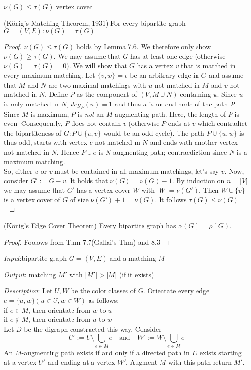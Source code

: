 $\nu(G) \leq \tau(G)$ vertex cover 
\begin{thm}(König's Matching Theorem, 1931)
For every bipartite graph $G=(V,E): \nu(G)=\tau(G)$ 
\end{thm}
\begin{proof} $\nu(G) \leq \tau(G)$ holds by Lemma 7.6. %
We therefore only show $\nu(G) \geq \tau(G)$.
We may assume that $G$ has at least one edge (otherwise $\nu(G)=\tau(G)=0).$ We will show that $G$ has a vertex $v$ that is matched in every maximum matching. Let $\{v,w\}=e$ be an arbitrary edge in $G$ and assume that $M$ and $N$ are two maximal matchings with $u$ not matched in $M$ and $v$ not matched in $N$. Define $P$ as the component of $(V,M \cup N)$ containing $u$.
Since $u$ is only matched in $N$, $deg_P(u)=1$ and thus $u$ is an end node of the path $P$. Since $M$ is maximum, $P$ is \emph{not} an $M$-augmenting path. Hece, the length of $P$ is even. Consequently, $P$ does not contain $v$ (otherwise $P$ ends at $v$ which contradict the bipartiteness of $G:P\cup \{u,v\}$ would be an odd cycle).
The path $P \cup \{u,w\}$ is thus odd, starts with vertex $v$ not matched in $N$ and ends with another vertex not matched in $N$. Hence $P \cup e$ is $N$-augmenting path; contracdiction since $N$ is a maximum matching.\\
So, either $u$ or $v$ must be contained in all maximum matchings, let's say $v$. Now, consider $G':=G-v$. It holds that $\nu(G)=\nu(G)-1$. By induction on $n=|V|$ we may assume that $G'$ has a vertex cover $W$ with $|W|=\nu(G')$. Then $W \cup \{v\}$ is a vertex cover of $G$ of size $\nu(G')+1=\nu(G)$. It follows $\tau(G)\leq \nu(G)$.
\end{proof}

\begin{cor}(König's Edge Cover Theorem)
Every bipartite graph has $\alpha(G)=\rho(G)$.
\end{cor}
\begin{proof}
Foolows from Thm 7.7(Gallai's Thm) and 8.3 %
\end{proof}


\emph{Input}:bipartite graph $G=(V,E)$ and a matching $M$

\emph{Output}: matching $M'$ with $|M'| > |M|$ (if it exists)

\emph{Description}: Let $U,W$ be the color classes of $G$. Orientate every edge $e=\{u,w\} (u \in U, w \in W)$ as follows: \\
if $e \in M$, then orientate from $w$ to $u$ \\
if $e \notin M$, then orientate from $u$ to $w$ \\
Let $D$ be the digraph constructed this way. Consider \[ U':=U \setminus \bigcup\limits_{e \in M}e \quad \text{and} \quad W':=W \setminus \bigcup\limits_{e \in M}e \]An $M$-augmenting path exists if and only if a directed path in $D$ exists starting at a vertex $U'$ and ending at a vertex $W'$. Augment $M$ with this path return $M'$.

